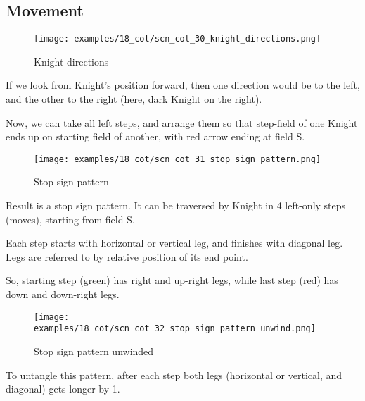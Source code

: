 \subsection*{Movement}
\label{sec:Conquest of Tlalocan/Trance-journey/Movement}

\noindent
\begin{wrapfigure}[10]{l}{0.4\textwidth}
\centering
\texttt{[image: examples/18\_cot/scn\_cot\_30\_knight\_directions.png]}
\caption{Knight directions}
\label{fig:scn_cot_30_knight_directions}
\end{wrapfigure}
If we look from Knight's position forward, then one direction would be to
the left, and the other to the right (here, dark Knight on the right).

Now, we can take all left steps, and arrange them so that step-field of one
Knight ends up on starting field of another, with red arrow ending at field S.


\vspace*{0.10\textheight}
\noindent
\begin{wrapfigure}[12]{l}{0.4\textwidth}
\centering
\texttt{[image: examples/18\_cot/scn\_cot\_31\_stop\_sign\_pattern.png]}
\caption{Stop sign pattern}
\label{fig:scn_cot_31_stop_sign_pattern}
\end{wrapfigure}
Result is a stop sign pattern. It can be traversed by Knight in 4 left-only
steps (moves), starting from field S.

Each step starts with horizontal or vertical leg, and finishes with diagonal
leg. Legs are referred to by relative position of its end point.

So, starting step (green) has right and up-right legs, while last step (red)
has down and down-right legs.

\clearpage %

\noindent
\begin{wrapfigure}{l}{0.4\textwidth} %
\centering
\texttt{[image: examples/18\_cot/scn\_cot\_32\_stop\_sign\_pattern\_unwind.png]}
\caption{Stop sign pattern unwinded}
\label{fig:scn_cot_32_stop_sign_pattern_unwind}
\end{wrapfigure}
To untangle this pattern, after each step both legs (horizontal or vertical,
and diagonal) gets longer by 1.

